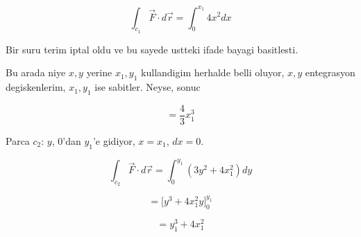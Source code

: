 \documentclass[12pt,fleqn]{article}
\begin{document}
\[ \int_{c_1} \vec{F} \cdot d\vec{r} = 
\int_0^{x_1} 4x^2 dx 
\]

Bir suru terim iptal oldu ve bu sayede ustteki ifade bayagi basitlesti. 

Bu arada niye $x,y$ yerine $x_1,y_1$ kullandigim herhalde belli oluyor,
$x,y$ entegrasyon degiskenlerim, $x_1,y_1$ ise sabitler. Neyse, sonuc

\[ = \frac{4}{3} x_1^3\]

Parca $c_2$: $y$, 0'dan $y_1$'e gidiyor, $x=x_1$, $dx = 0$. 

\[ \int_{c_2} \vec{F} \cdot d\vec{r} = 
\int_0^{y_1} (3y^2 + 4x_1^2) dy
\]

\[ = \bigg[ y^3 + 4x_1^2y \bigg]_0^{y_1} \]


\[ = y_1^3 + 4x_1^2 \]
\end{document}
